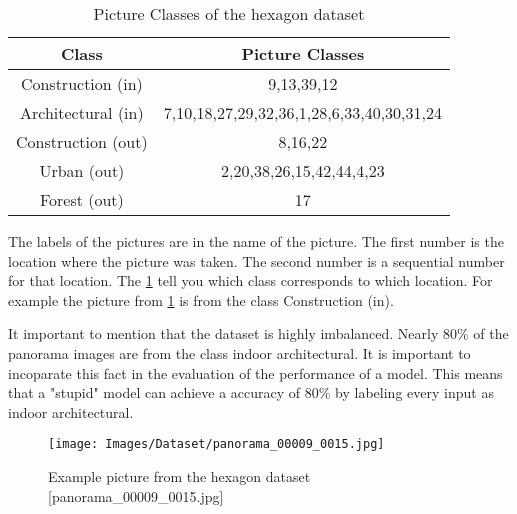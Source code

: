 \begin{table}
    \centering
    \begin{tabular}{cc}
    \toprule
    \textbf{Class}& \textbf{Picture Classes}\\ \midrule
    Construction (in) & 9,13,39,12 \\ \hline
    Architectural (in)& 7,10,18,27,29,32,36,1,28,6,33,40,30,31,24\\ \hline
    Construction (out)& 8,16,22\\ \hline
    Urban (out)& 2,20,38,26,15,42,44,4,23\\ \hline
    Forest (out)& 17\\
    \bottomrule
    \end{tabular}
    \caption{Picture Classes of the hexagon dataset
        \label{tab:dataset:piccoding}}
\end{table}

The labels of the pictures are in the name of the picture.
The first number is the location where the picture was taken.
The second number is a sequential number for that location.
The \cref{tab:dataset:piccoding} tell you which class corresponds to which location.
For example the picture from \cref{fig:dataset:examplepic} is from the class Construction (in).

It important to mention that the dataset is highly imbalanced.
Nearly 80\% of the panorama images are from the class indoor architectural.
It is important to incoparate this fact in the evaluation of the performance of a model.
This means that a "stupid" model can achieve a accuracy of 80\% by labeling every input as indoor architectural.

\begin{figure}
    \centering
    \texttt{[image: Images/Dataset/panorama\_00009\_0015.jpg]}
    \caption{Example picture from the hexagon dataset [panorama\_00009\_0015.jpg]}
    \label{fig:dataset:examplepic}
\end{figure}